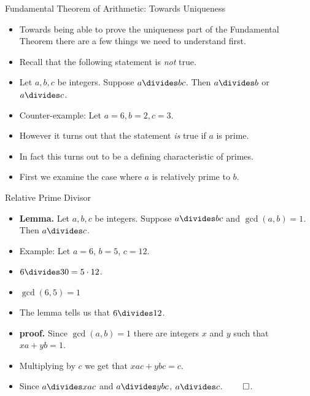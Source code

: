 \documentclass{beamer}
\begin{document}
\begin{frame}{Fundamental Theorem of Arithmetic: Towards Uniqueness}
\begin{itemize}
  \item Towards being able to prove the uniqueness part of the Fundamental Theorem
  there are a few things we need to understand first.
  \item Recall that the following statement is \emph{not} true.
  \item Let $a,b,c$ be integers. Suppose $a\divides bc$. Then $a\divides b$ or $a\divides c$.
  \item Counter-example: Let $a=6, b=2, c=3$.
  \item However it turns out that the statement \emph{is} true if $a$ is prime.
  \item In fact this turns out to be a defining characteristic of primes.
  \item First we examine the case where $a$ is relatively prime to $b$.
\end{itemize}

\end{frame}

\begin{frame}{Relative Prime Divisor}

\begin{itemize}
  \item \textbf{Lemma.} Let $a,b,c$ be integers. Suppose $a\divides bc$ and $\gcd(a,b)=1$. Then $a\divides c$.
  \item Example: Let $a=6$, $b=5$, $c=12$.
  \item $6\divides 30 = 5\cdot 12$.
  \item $\gcd(6,5) = 1$
  \item The lemma tells us that $6\divides 12$.
  \item \textbf{proof.} Since $\gcd(a,b)=1$ there are integers $x$ and $y$ such that $xa + yb = 1$.
  \item Multiplying by $c$ we get that $xac + ybc = c$.
  \item Since $a\divides xac$ and $a\divides ybc$, $a\divides c$. $\qed$.
\end{itemize}

\end{frame}
\end{document}
